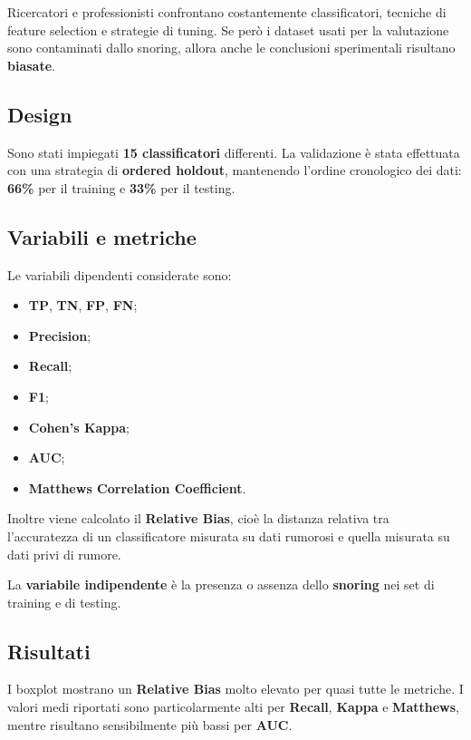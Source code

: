 Ricercatori e professionisti confrontano costantemente classificatori, tecniche di feature selection e strategie di tuning. Se però i dataset usati per la valutazione sono contaminati dallo snoring, allora anche le conclusioni sperimentali risultano \textbf{biasate}.

\subsection{Design}

Sono stati impiegati \textbf{15 classificatori} differenti. La validazione è stata effettuata con una strategia di \textbf{ordered holdout}, mantenendo l'ordine cronologico dei dati: \textbf{66\%} per il training e \textbf{33\%} per il testing.

\subsection{Variabili e metriche}

Le variabili dipendenti considerate sono:

\begin{itemize}
    \item \textbf{TP}, \textbf{TN}, \textbf{FP}, \textbf{FN};
    \item \textbf{Precision};
    \item \textbf{Recall};
    \item \textbf{F1};
    \item \textbf{Cohen's Kappa};
    \item \textbf{AUC};
    \item \textbf{Matthews Correlation Coefficient}.
\end{itemize}

Inoltre viene calcolato il \textbf{Relative Bias}, cioè la distanza relativa tra l'accuratezza di un classificatore misurata su dati rumorosi e quella misurata su dati privi di rumore.

La \textbf{variabile indipendente} è la presenza o assenza dello \textbf{snoring} nei set di training e di testing.

\subsection{Risultati}

I boxplot mostrano un \textbf{Relative Bias} molto elevato per quasi tutte le metriche. I valori medi riportati sono particolarmente alti per \textbf{Recall}, \textbf{Kappa} e \textbf{Matthews}, mentre risultano sensibilmente più bassi per \textbf{AUC}.

